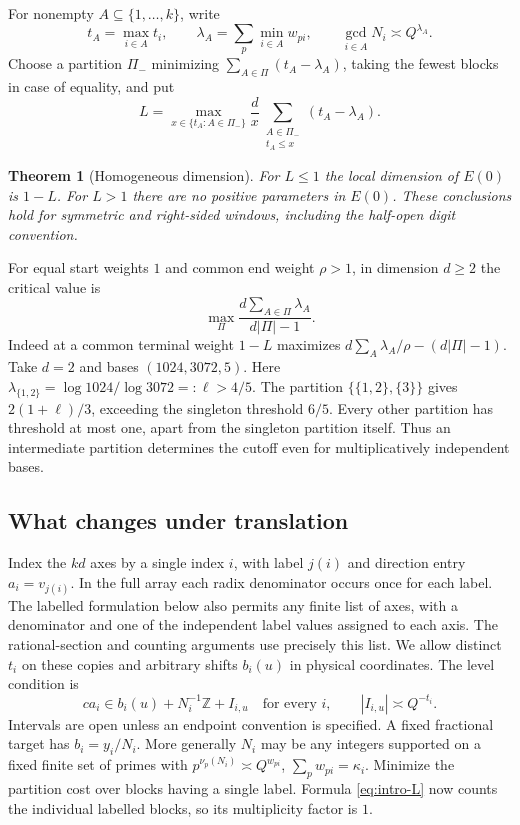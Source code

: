 \documentclass[11pt,reqno,a4paper]{amsart}
\newtheorem{theorem}{Theorem}[section]
\theoremstyle{remark}
\numberwithin{equation}{section}
\begin{document}
For nonempty \(A\subseteq\{1,\ldots,k\}\), write
\[
 t_A=\max_{i\in A}t_i,\qquad
 \lambda_A=\sum_p\min_{i\in A}w_{pi},\qquad
 \gcd_{i\in A}N_i\asymp Q^{\lambda_A}.
\]
Choose a partition \(\Pi_-\) minimizing \(\sum_{A\in\Pi}(t_A-\lambda_A)\), taking the fewest blocks in case of equality, and put
\begin{equation}\label{eq:intro-L}
 L=\max_{x\in\{t_A:A\in\Pi_-\}}
      \frac{d}{x}\sum_{\substack{A\in\Pi_-\\ t_A\le x}}(t_A-\lambda_A).
\end{equation}
\begin{theorem}[Homogeneous dimension]\label{thm:hom}
For \(L\le1\) the local dimension of \(E(0)\) is \(1-L\). For \(L>1\) there are no positive parameters in \(E(0)\). These conclusions hold for symmetric and right-sided windows, including the half-open digit convention.
\end{theorem}

For equal start weights \(1\) and common end weight \(\rho>1\), in dimension \(d\ge2\) the critical value is
\[
 \max_{\Pi}\frac{d\sum_{A\in\Pi}\lambda_A}{d|\Pi|-1}.
\]
Indeed at a common terminal weight \(1-L\) maximizes
\(d\sum_A\lambda_A/\rho-(d|\Pi|-1)\).
Take \(d=2\) and bases \((1024,3072,5)\).
Here \(\lambda_{\{1,2\}}=\log1024/\log3072=:\ell>4/5\).
The partition \(\{\{1,2\},\{3\}\}\) gives \(2(1+\ell)/3\), exceeding the singleton threshold \(6/5\). Every other partition has threshold at most one, apart from the singleton partition itself. Thus an intermediate partition determines the cutoff even for multiplicatively independent bases.

\subsection{What changes under translation}
Index the \(kd\) axes by a single index \(i\), with label \(j(i)\) and direction entry \(a_i=v_{j(i)}\). In the full array each radix denominator occurs once for each label. The labelled formulation below also permits any finite list of axes, with a denominator and one of the independent label values assigned to each axis. The rational-section and counting arguments use precisely this list. We allow distinct \(t_i\) on these copies and arbitrary shifts \(b_i(u)\) in physical coordinates. The level condition is
\[
 ca_i\in b_i(u)+N_i^{-1}\mathbb Z+I_{i,u}\quad\text{for every }i,
 \qquad |I_{i,u}|\asymp Q^{-t_i}.
\]
Intervals are open unless an endpoint convention is specified. A fixed fractional target has \(b_i=y_i/N_i\). More generally \(N_i\) may be any integers supported on a fixed finite set of primes with \(p^{\nu_p(N_i)}\asymp Q^{w_{pi}}\), \(\sum_pw_{pi}=\kappa_i\). Minimize the partition cost over blocks having a single label. Formula \eqref{eq:intro-L} now counts the individual labelled blocks, so its multiplicity factor is \(1\).
\end{document}
